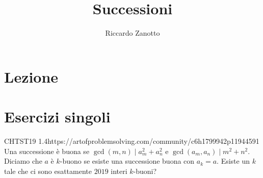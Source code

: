 \documentclass[12pt]{article}
\author{Riccardo Zanotto}
\title{Successioni}
\begin{document}
\maketitle

\section{Lezione}

\section{Esercizi singoli}

\begin{esercizio}{CHTST19 1.4}{https://artofproblemsolving.com/community/c6h1799942p11944591}
    Una successione è buona se $\gcd(m,n) \mid a_m^2 + a_n^2 \text{ e } \gcd(a_m,a_n) \mid m^2 + n^2$. Diciamo che $a$ è $k$-buono se esiste una successione buona con $a_k=a$. Esiste un $k$ tale che ci sono esattamente $2019$ interi $k$-buoni?
\end{esercizio}
\end{document}
